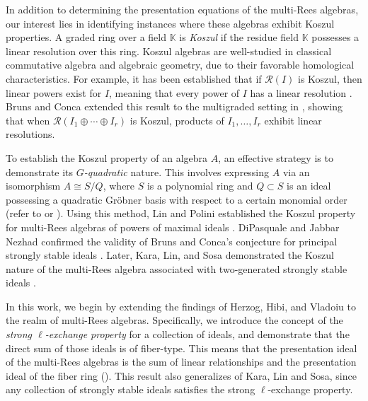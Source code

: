 \documentclass[11pt,a4paper,reqno,dvipsnames]{amsart}
\theoremstyle{plain}
\theoremstyle{definition}
\newtheorem{Assumptions and Discussion}[Theorem]{Assumptions and Discussion}
\theoremstyle{remark}
\begin{document}
In addition to determining the presentation equations of the multi-Rees algebras, our interest lies in identifying instances where these algebras exhibit Koszul properties. A graded ring over a field $\mathbb{K}$ is \emph{Koszul} if the residue field $\mathbb{K}$ possesses a linear resolution over this ring. Koszul algebras are well-studied in classical commutative algebra and algebraic geometry, due to their favorable homological characteristics.
For example, it has been established that if $\mathcal{R}(I)$ is Koszul, then linear powers exist for $I$, meaning that every power of $I$ has a linear resolution \cite[Corollary 3.6]{Blum}. Bruns and Conca extended this result to the multigraded setting in \cite[Theorem 3.4]{BCresPowers}, showing that when $\mathcal{R} (I_1 \oplus \cdots \oplus I_r)$ is Koszul, products of $I_1,\ldots, I_r$ exhibit linear resolutions.



To establish the Koszul property of an algebra $A$, an effective strategy is to demonstrate its \emph{$G$-quadratic} nature. This involves expressing $A$ via an isomorphism $A \cong S/Q$, where $S$ is a polynomial ring and $Q \subset S$ is an ideal possessing a quadratic Gr\"obner basis with respect to a certain monomial order (refer to \cite[Theorem 6.7]{EH} or \cite{Froberg}).  Using this method, Lin and Polini established the Koszul property for multi-Rees algebras of powers of maximal ideals \cite[Theorem 2.4]{LinPolini}. DiPasquale and Jabbar Nezhad confirmed the validity of Bruns and Conca's conjecture for principal strongly stable ideals \cite[Corollary 6.4]{dipasquale2020koszul}.  Later, Kara, Lin, and Sosa demonstrated the Koszul nature of the multi-Rees algebra associated with two-generated strongly stable ideals \cite[Theorems 3.2 and 6.11]{KLS}.




In this work, we begin by extending the findings of Herzog, Hibi, and Vladoiu \cite[Theorem 5.1]{MR2195995} to the realm of multi-Rees algebras. Specifically, we introduce the concept of the \emph{strong $\ell$-exchange property} for a collection of ideals, and demonstrate that the direct sum of those ideals is of fiber-type. This means that the presentation ideal of the multi-Rees algebras is the sum of linear relationships and the presentation ideal of the fiber ring (). This result also generalizes 
\cite[Theorem 3.2]{KLS}
of Kara, Lin and Sosa, since any collection of strongly stable ideals satisfies the strong $\ell$-exchange property.
\end{document}
